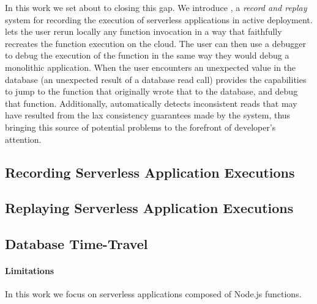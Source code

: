 In this work we set about to closing this gap. We introduce \system, a
\emph{record and replay} system for recording the execution of serverless
applications in active deployment. \system lets the user rerun locally any
function invocation in a way that faithfully recreates the function execution on
the cloud. The user can then use a debugger to debug the execution of the
function in the same way they would debug a monolithic application. When the
user encounters an unexpected value in the database (an unexpected result of a
database read call) \system provides the capabilities to jump to the function
that originally wrote that to the database, and debug that function.
Additionally, \system automatically detects inconsistent reads that may have
resulted from the lax consistency guarantees made by the system, thus bringing
this source of potential problems to the forefront of developer's attention.

\subsection{Recording Serverless Application Executions}
\subsection{Replaying Serverless Application Executions}
\subsection{Database Time-Travel}

\paragraph{Limitations}
In this work we focus on serverless applications composed of Node.js functions.

%
%
%
%
